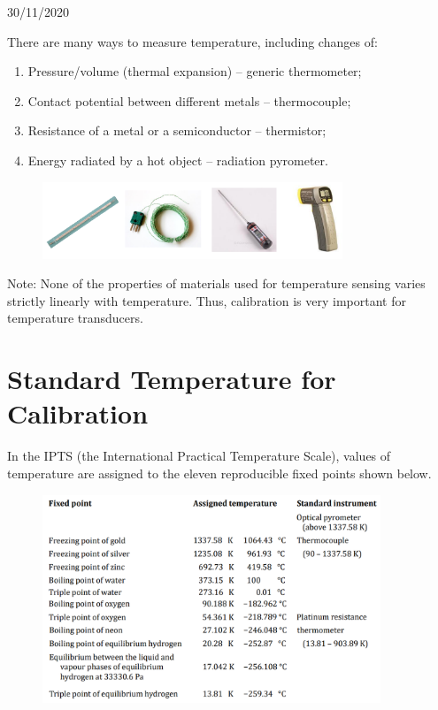 \documentclass[class=report, crop=false, 12pt,a4paper]{standalone}
\begin{document}
\begin{center}
  30/11/2020
\end{center}
There are many ways to measure temperature, including changes of:
\begin{enumerate}
  \item Pressure/volume (thermal expansion) – generic thermometer;
  \item Contact potential between different metals – thermocouple;
  \item Resistance of a metal or a semiconductor – thermistor;
  \item Energy radiated by a hot object – radiation pyrometer.
\end{enumerate}
\begin{figure}[H]
  \centering
  \includegraphics[width = 0.8\textwidth]{../img/Mdiagram57.png}
\end{figure}
Note: None of the properties of materials used for temperature sensing varies strictly linearly with temperature. Thus, calibration is very important for temperature transducers.
\section{Standard Temperature for Calibration}
In the IPTS (the International Practical Temperature Scale), values of temperature are assigned to the eleven reproducible fixed points shown below.
\begin{figure}[H]
  \centering
  \includegraphics[width = 0.9\textwidth]{../img/Mdiagram59.png}
\end{figure}
\end{document}
